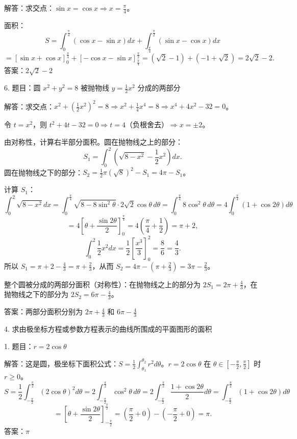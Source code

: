 解答：求交点：\(\sin x=\cos x\Rightarrow x=\frac{\pi}{4}\)。

面积：
\[ S=\int_{0}^{\frac{\pi}{4}}(\cos x-\sin x)dx+\int_{\frac{\pi}{4}}^{\frac{\pi}{2}}(\sin x-\cos x)dx \]
\[ =\left[\sin x+\cos x\right]_{0}^{\frac{\pi}{4}}+\left[-\cos x-\sin x\right]_{\frac{\pi}{4}}^{\frac{\pi}{2}}=\left(\sqrt2-1\right)+\left(-1+\sqrt2\right)=2\sqrt2-2. \]
答案：\(2\sqrt2-2\)

6. 题目：圆 \(x^{2}+y^{2}=8\) 被抛物线 \(y=\frac{1}{2}x^{2}\) 分成的两部分

解答：求交点：\(x^{2}+\left(\frac{1}{2}x^{2}\right)^{2}=8\Rightarrow x^{2}+\frac{1}{4}x^{4}=8\Rightarrow x^{4}+4x^{2}-32=0\)。

令 \(t=x^{2}\)，则 \(t^{2}+4t-32=0\Rightarrow t=4\)（负根舍去）\(\Rightarrow x=\pm2\)。

由对称性，计算右半部分面积。圆在抛物线之上的部分：
\[ S_{1}=\int_{0}^{2}\left(\sqrt{8-x^{2}}-\frac{1}{2}x^{2}\right)dx. \]
圆在抛物线之下的部分：\(S_{2}=\frac{1}{2}\pi(\sqrt8)^{2}-S_{1}=4\pi-S_{1}\)。

计算 \(S_{1}\)：
\[ \int_{0}^{2}\sqrt{8-x^{2}}dx=\int_{0}^{\frac{\pi}{4}}\sqrt{8-8\sin^{2}\theta}\cdot2\sqrt2\cos\theta\,d\theta=\int_{0}^{\frac{\pi}{4}}8\cos^{2}\theta\,d\theta=4\int_{0}^{\frac{\pi}{4}}(1+\cos2\theta)d\theta \]
\[ =4\left[\theta+\frac{\sin2\theta}{2}\right]_{0}^{\frac{\pi}{4}}=4\left(\frac{\pi}{4}+\frac{1}{2}\right)=\pi+2, \]
\[ \int_{0}^{2}\frac{1}{2}x^{2}dx=\frac{1}{2}\left[\frac{x^{3}}{3}\right]_{0}^{2}=\frac{8}{6}=\frac{4}{3}. \]
所以 \(S_{1}=\pi+2-\frac{4}{3}=\pi+\frac{2}{3}\)，从而 \(S_{2}=4\pi-\left(\pi+\frac{2}{3}\right)=3\pi-\frac{2}{3}\)。

整个圆被分成的两部分面积（对称性）：在抛物线之上的部分为 \(2S_{1}=2\pi+\frac{4}{3}\)，在抛物线之下的部分为 \(2S_{2}=6\pi-\frac{4}{3}\)。

答案：两部分面积分别为 \(2\pi+\frac{4}{3}\) 和 \(6\pi-\frac{4}{3}\)

4. 求由极坐标方程或参数方程表示的曲线所围成的平面图形的面积

1. 题目：\(r=2\cos\theta\)

解答：这是圆，极坐标下面积公式：\(S=\frac{1}{2}\int_{\theta_{1}}^{\theta_{2}}r^{2}d\theta\)。\(r=2\cos\theta\) 在 \(\theta\in\left[-\frac{\pi}{2},\frac{\pi}{2}\right]\) 时 \(r\ge0\)。
\[ S=\frac{1}{2}\int_{-\frac{\pi}{2}}^{\frac{\pi}{2}}(2\cos\theta)^{2}d\theta=2\int_{-\frac{\pi}{2}}^{\frac{\pi}{2}}\cos^{2}\theta\,d\theta=2\int_{-\frac{\pi}{2}}^{\frac{\pi}{2}}\frac{1+\cos2\theta}{2}d\theta=\int_{-\frac{\pi}{2}}^{\frac{\pi}{2}}(1+\cos2\theta)d\theta \]
\[ =\left[\theta+\frac{\sin2\theta}{2}\right]_{-\frac{\pi}{2}}^{\frac{\pi}{2}}=\left(\frac{\pi}{2}+0\right)-\left(-\frac{\pi}{2}+0\right)=\pi. \]
答案：\(\pi\)

